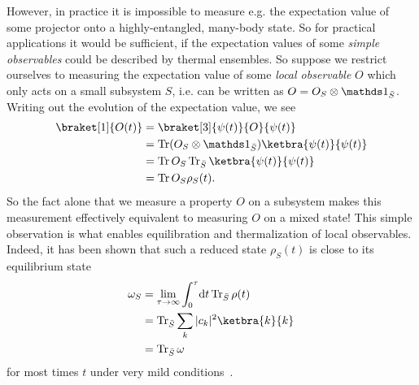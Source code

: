 However, in practice it is impossible to measure e.g. the expectation value of some projector onto a highly-entangled, many-body state. So for practical applications it would be sufficient, if the expectation values of some \emph{simple observables} could be described by thermal ensembles. So suppose
we restrict ourselves to measuring the expectation value of some \emph{local observable} $O$ which only acts on a small subsystem $S$, i.e. can be written as $O=O_S\otimes \bbone_{\bar{S}}$. Writing out the evolution of the expectation value, we see
\begin{align}
	\braket[1]{O(t)} &= \braket[3]{\psi(t)}{O}{\psi(t)} \\
	& = \Tr (O_S\otimes\bbone_{\bar{S}})\ketbra{\psi(t)}{\psi(t)}\\
	& = \Tr O_S \Tr_{\bar S} \ketbra{\psi(t)}{\psi(t)}\\
	&= \Tr O_S \rho_S(t).
\end{align}
So the fact alone that we measure a property $O$ on a subsystem makes this measurement effectively equivalent to measuring $O$ on a mixed state! This simple observation is what enables equilibration and thermalization of local observables. Indeed, it has been shown that such a reduced state $\rho_S(t)$ is close to its equilibrium state
\begin{align}
	\omega_S &= \lim_{\tau\rightarrow\infty}\int_{0}^{\tau}\!\mathrm{d}t \Tr_{\bar S}\rho(t)\\
	&= \Tr_{\bar S} \sum_k |c_k|^2 \ketbra{k}{k}\\
	&= \Tr_{\bar S} \omega
\end{align}\label{eq:diagonal-ensemble}
for most times $t$ under very mild conditions~\cite{reimannFoundationStatisticalMechanics2008,lindenQuantumMechanicalEvolution2009}. 

